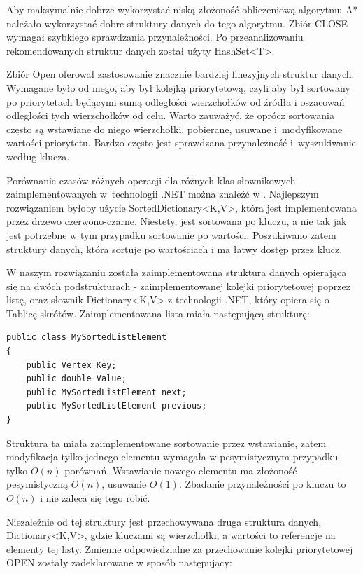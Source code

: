\documentclass[a4paper,11pt,twoside,openright]{report}
\theoremstyle{definition}
\begin{document}
Aby maksymalnie dobrze wykorzystać niską złożoność obliczeniową algorytmu A*
należało wykorzystać dobre struktury danych do tego algorytmu. Zbiór CLOSE
wymagał szybkiego sprawdzania przynależności. Po przeanalizowaniu rekomendowanych
struktur danych \cite{Dotnet struktury} został użyty HashSet<T>.

Zbiór Open oferował zastosowanie znacznie bardziej finezyjnych struktur danych.
Wymagane było od niego, aby był kolejką priorytetową, czyli aby był sortowany po
priorytetach będącymi sumą odległości wierzchołków od źródła i oszacowań odległości
tych wierzchołków od celu. Warto zauważyć, że oprócz sortowania często są wstawiane
do niego wierzchołki, pobierane, usuwane i~modyfikowane wartości priorytetu.
Bardzo często jest sprawdzana przynależność i~wyszukiwanie według klucza.

Porównanie czasów różnych operacji dla różnych klas słownikowych zaimplementowanych
w~technologii .NET można znaleźć w \cite{C w pigulce}.
Najlepszym rozwiązaniem byłoby użycie SortedDictionary<K,V>,
która jest implementowana przez drzewo czerwono-czarne. Niestety, jest
sortowana po kluczu, a nie tak jak jest potrzebne w tym przypadku sortowanie
po wartości. Poszukiwano zatem struktury danych, która sortuje po wartościach
i ma łatwy dostęp przez klucz.

W naszym rozwiązaniu została zaimplementowana struktura danych opierająca się
na dwóch podstrukturach - zaimplementowanej kolejki priorytetowej poprzez listę,
oraz słownik Dictionary<K,V> z technologii .NET, który opiera się o Tablicę
skrótów. Zaimplementowana lista miała następującą strukturę:

\begin{verbatim}
public class MySortedListElement
{
    public Vertex Key;
    public double Value;
    public MySortedListElement next;
    public MySortedListElement previous;
}
\end{verbatim}

Struktura ta miała zaimplementowane sortowanie przez wstawianie, zatem modyfikacja
tylko jednego elementu wymagała w pesymistycznym przypadku tylko $O(n)$ porównań.
Wstawianie nowego elementu ma złożoność pesymistyczną $O(n)$, usuwanie $O(1)$.
Zbadanie przynależności po kluczu to $O(n)$ i nie zaleca się tego robić.

Niezależnie od tej struktury jest przechowywana druga struktura danych,
Dictionary<K,V>, gdzie kluczami są wierzchołki, a wartości to referencje na
elementy tej listy. Zmienne odpowiedzialne za przechowanie kolejki priorytetowej
OPEN zostały zadeklarowane w sposób następujący:
\end{document}
